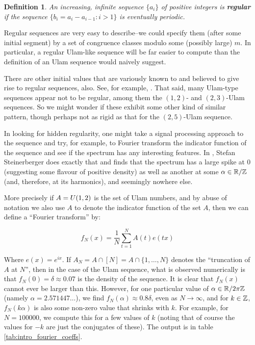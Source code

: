 \documentclass{report}
\newtheorem{definition}[theorem]{Definition}
\theoremstyle{remark}
\numberwithin{equation}{section}
\begin{document}
\begin{definition}\label{def:regularity}
  An increasing, infinite sequence $\{a_i\}$ of positive integers is
  \textbf{regular} if the sequence $\{b_i = a_i - a_{i-1} : i > 1\}$
  is eventually periodic.
\end{definition}

Regular sequences are very easy to describe--we could specify them
(after some initial segment) by a set of congruence classes modulo
some (possibly large) $m$.  In particular, a regular Ulam-like
sequence will be far easier to compute than the definition of an Ulam
sequence would naively suggest.

There are other initial values that are variously known to and
believed to give rise to regular sequences, also.  See, for example,
\cite{finch:em1992}.  That said, many Ulam-type sequences appear not
to be regular, among them the $(1,2)$- and $(2,3)$-Ulam sequences.  So
we might wonder if these exhibit some other kind of similar pattern,
though perhaps not as rigid as that for the $(2,5)$-Ulam sequence.  

In looking for hidden regularity, one might take a signal processing
approach to the sequence and try, for example, to Fourier transform
the indicator function of the sequence and see if the spectrum has any
interesting features.  In \cite{steinerberger:preprint}, Stefan
Steinerberger does exactly that and finds that the spectrum has a
large spike at 0 (suggesting some flavour of positive density) as well
as another at some $\alpha \in \mathbb{R}/\mathbb{Z}$ (and, therefore, at its
harmonics), and seemingly nowhere else.

More precisely if $A = U(1,2)$ is the set of Ulam numbers, and by
abuse of notation we also use $A$ to denote the indicator function of
the set $A$, then we can define a ``Fourier transform'' by:

\[f_N(x) = \frac{1}{N}\sum_{t=1}^N A(t) e(tx)\] 

Where $e(x) = e^{ix}$.  If
$A_N = A \cap [N] = A \cap \{1, \ldots, N\}$ denotes the ``truncation
of $A$ at $N$'', then in the case of the Ulam sequence, what is
observed numerically is that $f_N(0) = \delta \approx 0.07$ is the
density of the sequence.  It is clear that $f_N(x)$ cannot ever be
larger than this.  However, for one particular value of
$\alpha \in \mathbb{R}/2\pi\mathbb{Z}$ (namely $\alpha = 2.571447\ldots$), we find
$f_N(\alpha) \approx 0.8 \delta$, even as $N \to \infty$, and for
$k \in \mathbb{Z}$, $f_N(k \alpha)$ is also some non-zero value that shrinks
with $k$.  For example, for $N = 100000$, we compute this for a few
values of $k$ (noting that of course the values for $-k$ are just the
conjugates of these).  The output is in table
\ref{tab:intro_fourier_coeffs}.
\end{document}
